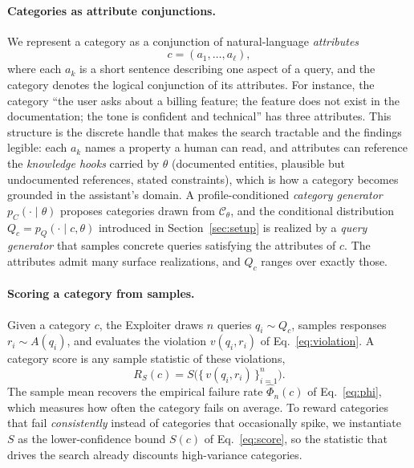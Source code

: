 \documentclass[11pt,a4paper]{article}
\begin{document}
\paragraph{Categories as attribute conjunctions.}
We represent a category as a conjunction of natural-language \emph{attributes}
\begin{equation}
  c = (a_1, \dots, a_\ell),
  \label{eq:attributes}
\end{equation}
where each $a_k$ is a short sentence describing one aspect of a query, and the
category denotes the logical conjunction of its attributes. For instance, the
category ``the user asks about a billing feature; the feature does not exist in
the documentation; the tone is confident and technical'' has three attributes.
This structure is the discrete handle that makes the search tractable and the
findings legible: each $a_k$ names a property a human can read, and attributes
can reference the \emph{knowledge hooks} carried by $\theta$ (documented
entities, plausible but undocumented references, stated constraints), which is how a
category becomes grounded in the assistant's domain. A profile-conditioned
\emph{category generator} $p_C(\cdot \mid \theta)$ proposes categories drawn from
$\mathcal{C}_\theta$, and the conditional distribution $Q_c = p_Q(\cdot \mid c,
\theta)$ introduced in Section~\ref{sec:setup} is realized by a \emph{query
generator} that samples concrete queries satisfying the attributes of $c$. The
attributes admit many surface realizations, and $Q_c$ ranges over exactly those.

\paragraph{Scoring a category from samples.}
Given a category $c$, the Exploiter draws $n$ queries $q_i \sim Q_c$, samples
responses $r_i \sim A(q_i)$, and evaluates the violation $v(q_i, r_i)$ of
Eq.~\eqref{eq:violation}. A category score is any sample statistic of these
violations,
\begin{equation}
  R_S(c) = S\big(\{\, v(q_i, r_i) \,\}_{i=1}^{n}\big).
  \label{eq:catscore}
\end{equation}
The sample mean recovers the empirical failure rate $\hat\Phi_n(c)$ of
Eq.~\eqref{eq:phi}, which measures how often the category fails on average. To
reward categories that fail \emph{consistently} instead of categories that
occasionally spike, we instantiate $S$ as the lower-confidence bound $S(c)$ of
Eq.~\eqref{eq:score}, so the statistic that drives the search already discounts
high-variance categories.
\end{document}
